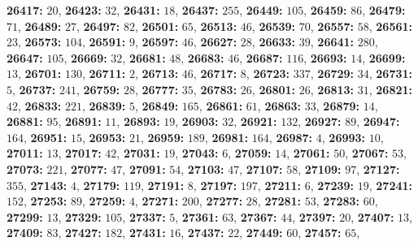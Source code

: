 \textsf{\bfseries 26417:} $20$, \textsf{\bfseries 26423:} $32$, \textsf{\bfseries 26431:} $18$, \textsf{\bfseries 26437:} $255$, \textsf{\bfseries 26449:} $105$, \textsf{\bfseries 26459:} $86$, \textsf{\bfseries 26479:} $71$, \textsf{\bfseries 26489:} $27$, \textsf{\bfseries 26497:} $82$, \textsf{\bfseries 26501:} $65$, \textsf{\bfseries 26513:} $46$, \textsf{\bfseries 26539:} $70$, \textsf{\bfseries 26557:} $58$, \textsf{\bfseries 26561:} $23$, \textsf{\bfseries 26573:} $104$, \textsf{\bfseries 26591:} $9$, \textsf{\bfseries 26597:} $46$, \textsf{\bfseries 26627:} $28$, \textsf{\bfseries 26633:} $39$, \textsf{\bfseries 26641:} $280$, \textsf{\bfseries 26647:} $105$, \textsf{\bfseries 26669:} $32$, \textsf{\bfseries 26681:} $48$, \textsf{\bfseries 26683:} $46$, \textsf{\bfseries 26687:} $116$, \textsf{\bfseries 26693:} $14$, \textsf{\bfseries 26699:} $13$, \textsf{\bfseries 26701:} $130$, \textsf{\bfseries 26711:} $2$, \textsf{\bfseries 26713:} $46$, \textsf{\bfseries 26717:} $8$, \textsf{\bfseries 26723:} $337$, \textsf{\bfseries 26729:} $34$, \textsf{\bfseries 26731:} $5$, \textsf{\bfseries 26737:} $241$, \textsf{\bfseries 26759:} $28$, \textsf{\bfseries 26777:} $35$, \textsf{\bfseries 26783:} $26$, \textsf{\bfseries 26801:} $26$, \textsf{\bfseries 26813:} $31$, \textsf{\bfseries 26821:} $42$, \textsf{\bfseries 26833:} $221$, \textsf{\bfseries 26839:} $5$, \textsf{\bfseries 26849:} $165$, \textsf{\bfseries 26861:} $61$, \textsf{\bfseries 26863:} $33$, \textsf{\bfseries 26879:} $14$, \textsf{\bfseries 26881:} $95$, \textsf{\bfseries 26891:} $11$, \textsf{\bfseries 26893:} $19$, \textsf{\bfseries 26903:} $32$, \textsf{\bfseries 26921:} $132$, \textsf{\bfseries 26927:} $89$, \textsf{\bfseries 26947:} $164$, \textsf{\bfseries 26951:} $15$, \textsf{\bfseries 26953:} $21$, \textsf{\bfseries 26959:} $189$, \textsf{\bfseries 26981:} $164$, \textsf{\bfseries 26987:} $4$, \textsf{\bfseries 26993:} $10$, \textsf{\bfseries 27011:} $13$, \textsf{\bfseries 27017:} $42$, \textsf{\bfseries 27031:} $19$, \textsf{\bfseries 27043:} $6$, \textsf{\bfseries 27059:} $14$, \textsf{\bfseries 27061:} $50$, \textsf{\bfseries 27067:} $53$, \textsf{\bfseries 27073:} $221$, \textsf{\bfseries 27077:} $47$, \textsf{\bfseries 27091:} $54$, \textsf{\bfseries 27103:} $47$, \textsf{\bfseries 27107:} $58$, \textsf{\bfseries 27109:} $97$, \textsf{\bfseries 27127:} $355$, \textsf{\bfseries 27143:} $4$, \textsf{\bfseries 27179:} $119$, \textsf{\bfseries 27191:} $8$, \textsf{\bfseries 27197:} $197$, \textsf{\bfseries 27211:} $6$, \textsf{\bfseries 27239:} $19$, \textsf{\bfseries 27241:} $152$, \textsf{\bfseries 27253:} $89$, \textsf{\bfseries 27259:} $4$, \textsf{\bfseries 27271:} $200$, \textsf{\bfseries 27277:} $28$, \textsf{\bfseries 27281:} $53$, \textsf{\bfseries 27283:} $60$, \textsf{\bfseries 27299:} $13$, \textsf{\bfseries 27329:} $105$, \textsf{\bfseries 27337:} $5$, \textsf{\bfseries 27361:} $63$, \textsf{\bfseries 27367:} $44$, \textsf{\bfseries 27397:} $20$, \textsf{\bfseries 27407:} $13$, \textsf{\bfseries 27409:} $83$, \textsf{\bfseries 27427:} $182$, \textsf{\bfseries 27431:} $16$, \textsf{\bfseries 27437:} $22$, \textsf{\bfseries 27449:} $60$, \textsf{\bfseries 27457:} $65$, 
